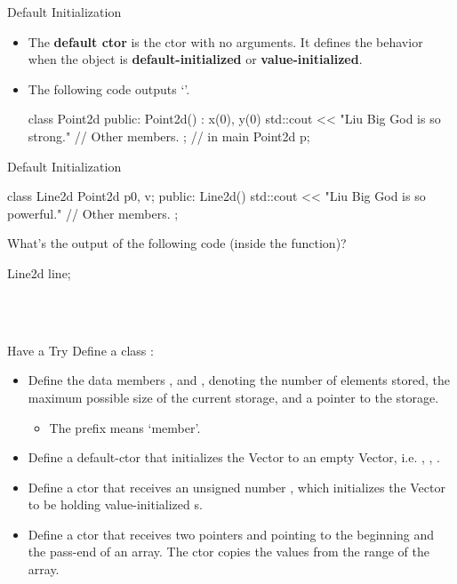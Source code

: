 \documentclass{beamer}
\begin{document}
\begin{frame}[fragile]{Default Initialization}
    \begin{itemize}
        \item The \textbf{default ctor} is the ctor with no arguments. It defines the behavior when the object is \textbf{default-initialized} or \textbf{value-initialized}.
        \item The following code outputs `'.
        \begin{cpp}
class Point2d {
 public:
  Point2d() : x(0), y(0) {
    std::cout << "Liu Big God is so strong.\n"
  }
  // Other members.
};
// in main
Point2d p;
        \end{cpp}
    \end{itemize}
\end{frame}

\begin{frame}[fragile]{Default Initialization}
    \begin{cpp}
class Line2d {
  Point2d p0, v;
 public:
  Line2d()
    { std::cout << "Liu Big God is so powerful.\n" }
  // Other members.
};
    \end{cpp}
    What's the output of the following code (inside the  function)?
    \begin{cpp}
Line2d line;
    \end{cpp}
    \pause
    \\
    \\
\end{frame}

\begin{frame}[fragile]{Have a Try}
    Define a class :
    \begin{itemize}
        \item Define the data members ,  and , denoting the number of elements stored, the maximum possible size of the current storage, and a pointer to the storage.
        \begin{itemize}
            \item The prefix  means `member'.
        \end{itemize}
        \item Define a default-ctor that initializes the Vector to an empty Vector, i.e. , , .
        \item Define a ctor that receives an unsigned number , which initializes the Vector to be holding  value-initialized s.
        \item Define a ctor that receives two pointers  and  pointing to the beginning and the pass-end of an array. The ctor copies the values from the range of the array.
    \end{itemize}
\end{frame}
\end{document}
